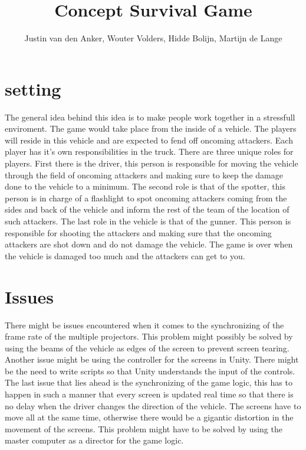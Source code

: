 \documentclass[10pt,a4paper]{article}
\author{Justin van den Anker, Wouter Volders, Hidde Bolijn, Martijn de Lange}
\title{Concept Survival Game}
\begin{document}
\maketitle
\newpage
\section{setting}
The general idea behind this idea is to make people work together in a stressfull enviroment. The game would take place from the inside of a vehicle. The players will reside in this vehicle and are expected to fend off oncoming attackers. Each player has it's own responsibilities in the truck. There are three unique roles for players. First there is the driver, this person is responsible for moving the vehicle through the field of oncoming attackers and making sure to keep the damage done to the vehicle to a minimum. The second role is that of the spotter, this person is in charge of a flashlight to spot oncoming attackers coming from the sides and back of the vehicle and inform the rest of the team of the location of such attackers. The last role in the vehicle is that of the gunner. This person is responsible for shooting the attackers and making sure that the oncoming attackers are shot down and do not damage the vehicle. The game is over when the vehicle is damaged too much and the attackers can get to you. 

\section{Issues}

There might be issues encountered when it comes to the synchronizing of the frame rate of the multiple projectors. This problem might possibly be solved by using the beams of the vehicle as edges of the screen to prevent screen tearing. Another issue might be using the controller for the screens in Unity. There might be the need to write scripts so that Unity understands the input of the controls. The last issue that lies ahead is the synchronizing of the game logic, this has to happen in such a manner that every screen is updated real time so that there is no delay when the driver changes the direction of the vehicle. The screens have to move all at the same time, otherwise there would be a gigantic distortion in the movement of the screens. This problem might have to be solved by using the master computer as a director for the game logic.
\end{document}
